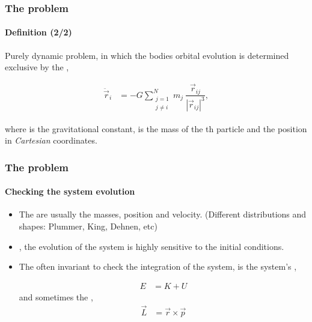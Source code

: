 \begin{frame}
    \frametitle{The {\nbody} problem}
    \framesubtitle{Definition (2/2)}

    Purely dynamic problem, in which the bodies orbital evolution
    is determined exclusive by the ,

    \begin{align}
        \ddot{\vec{r}}_{i} &= -G \sum\limits^{N}_{\substack{j=1\\j\neq i}}
                              m_{j}\ \dfrac{\vec{r}_{ij}}{
                              | \vec{r}_{ij}|^{3}}\label{eq:nbody},
    \end{align}

    \noindent
    where  is the gravitational constant,
     is the mass of the th particle
    and  the position in \emph{Cartesian} coordinates.
\end{frame}


\begin{frame}
    \frametitle{The {\nbody} problem}
    \framesubtitle{Checking the system evolution}

    \begin{itemize}
        \item The  are usually the masses,
              position and velocity.
              (Different distributions and shapes: Plummer, King, Dehnen, etc)

        \item {}, the evolution of the system
              is highly sensitive to the initial conditions.

        \item The often invariant to check the integration of the system,
              is the system's ,

            \begin{align}
                E &= K + U
            \end{align}
            and sometimes the ,
            \begin{align}
                \vec{L} &= \vec{r} \times \vec{p}
            \end{align}

    \end{itemize}
\end{frame}

